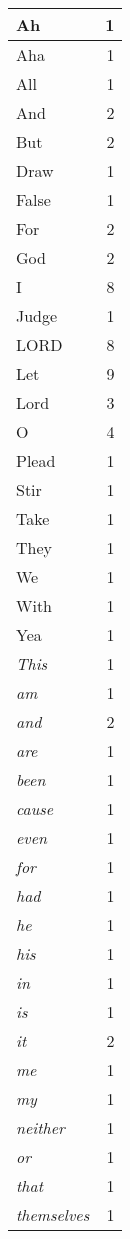 \begin{center}
\begin{longtable}{l|r}
\hline \hline
\endlastfoot
Ah & 1 \\ \hline
Aha & 1 \\ \hline
All & 1 \\ \hline
And & 2 \\ \hline
But & 2 \\ \hline
Draw & 1 \\ \hline
False & 1 \\ \hline
For & 2 \\ \hline
God & 2 \\ \hline
I & 8 \\ \hline
Judge & 1 \\ \hline
LORD & 8 \\ \hline
Let & 9 \\ \hline
Lord & 3 \\ \hline
O & 4 \\ \hline
Plead & 1 \\ \hline
Stir & 1 \\ \hline
Take & 1 \\ \hline
They & 1 \\ \hline
We & 1 \\ \hline
With & 1 \\ \hline
Yea & 1 \\ \hline
\emph{This} & 1 \\ \hline
\emph{am} & 1 \\ \hline
\emph{and} & 2 \\ \hline
\emph{are} & 1 \\ \hline
\emph{been} & 1 \\ \hline
\emph{cause} & 1 \\ \hline
\emph{even} & 1 \\ \hline
\emph{for} & 1 \\ \hline
\emph{had} & 1 \\ \hline
\emph{he} & 1 \\ \hline
\emph{his} & 1 \\ \hline
\emph{in} & 1 \\ \hline
\emph{is} & 1 \\ \hline
\emph{it} & 2 \\ \hline
\emph{me} & 1 \\ \hline
\emph{my} & 1 \\ \hline
\emph{neither} & 1 \\ \hline
\emph{or} & 1 \\ \hline
\emph{that} & 1 \\ \hline
\emph{themselves} & 1 \\ \hline

\end{longtable}
\end{center}
